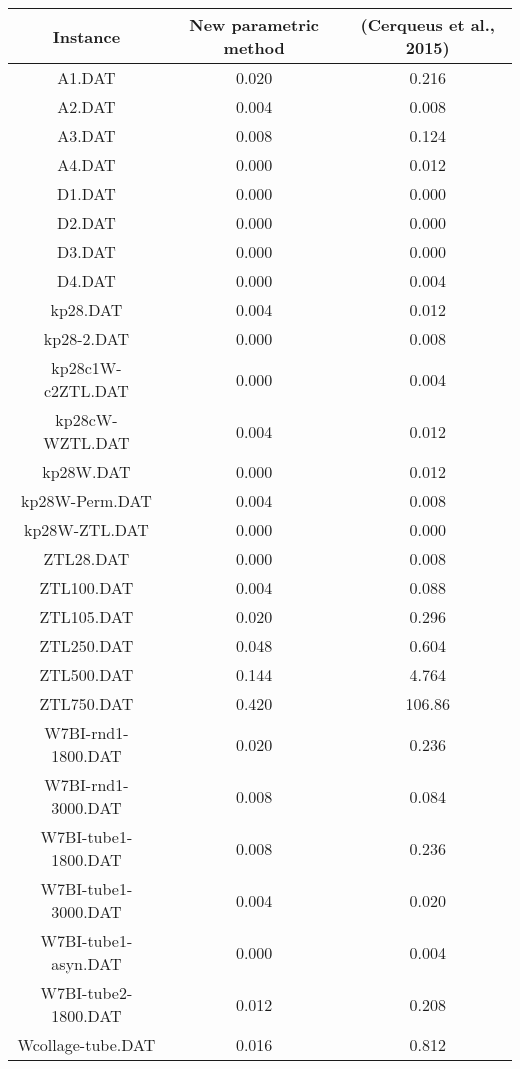 \documentclass[11pt,a4paper]{article}
\begin{document}
\begin{table}
\begin{tabular}{c|cc|}
\hline
Instance & New parametric method & (Cerqueus et al., 2015)\\
\hline
A1.DAT & 
0.020
& 
0.216
\\
A2.DAT & 
0.004
& 
0.008
\\
A3.DAT & 
0.008
& 
0.124
\\
A4.DAT & 
0.000
& 
0.012
\\
D1.DAT & 
0.000
& 
0.000
\\
D2.DAT & 
0.000
& 
0.000
\\
D3.DAT & 
0.000
& 
0.000
\\
D4.DAT & 
0.000
& 
0.004
\\
kp28.DAT & 
0.004
& 
0.012
\\
kp28-2.DAT & 
0.000
& 
0.008
\\
kp28c1W-c2ZTL.DAT & 
0.000
& 
0.004
\\
kp28cW-WZTL.DAT & 
0.004
& 
0.012
\\
kp28W.DAT & 
0.000
& 
0.012
\\
kp28W-Perm.DAT & 
0.004
& 
0.008
\\
kp28W-ZTL.DAT & 
0.000
& 
0.000
\\
ZTL28.DAT & 
0.000
& 
0.008
\\
ZTL100.DAT & 
0.004
& 
0.088
\\
ZTL105.DAT & 
0.020
& 
0.296
\\
ZTL250.DAT & 
0.048
& 
0.604
\\
ZTL500.DAT & 
0.144
& 
4.764
\\
ZTL750.DAT & 
0.420
& 
106.86
\\
W7BI-rnd1-1800.DAT & 
0.020
& 
0.236
\\
W7BI-rnd1-3000.DAT & 
0.008
& 
0.084
\\
W7BI-tube1-1800.DAT & 
0.008
& 
0.236
\\
W7BI-tube1-3000.DAT & 
0.004
& 
0.020
\\
W7BI-tube1-asyn.DAT & 
0.000
& 
0.004
\\
W7BI-tube2-1800.DAT & 
0.012
& 
0.208
\\
Wcollage-tube.DAT & 
0.016
& 
0.812
\\
\hline
\end{tabular}
\end{table}
\end{document}
